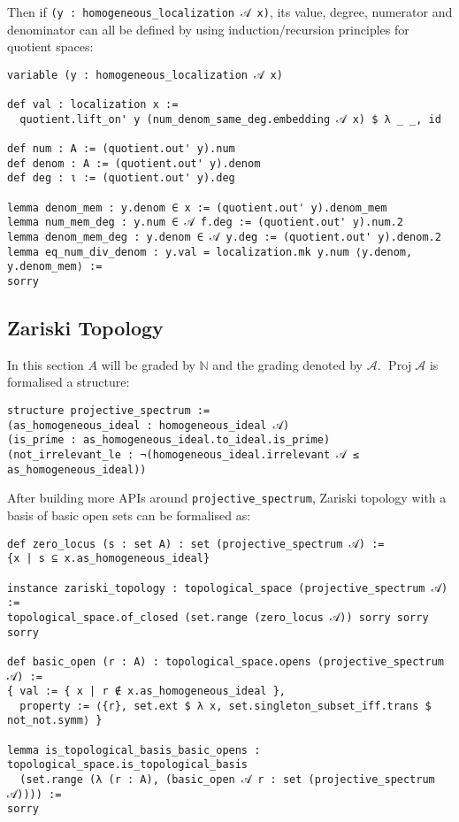 \documentclass[a4paper,UKenglish,cleveref, autoref, thm-restate]{lipics-v2021}
\begin{document}
Then if \lstinline{(y : homogeneous_localization 𝒜 x)}, its value, degree, numerator and denominator can all be defined by using induction/recursion principles for quotient spaces:
\begin{lstlisting}
variable (y : homogeneous_localization 𝒜 x)
 
def val : localization x :=
  quotient.lift_on' y (num_denom_same_deg.embedding 𝒜 x) $ λ _ _, id

def num : A := (quotient.out' y).num
def denom : A := (quotient.out' y).denom
def deg : ι := (quotient.out' y).deg

lemma denom_mem : y.denom ∈ x := (quotient.out' y).denom_mem
lemma num_mem_deg : y.num ∈ 𝒜 f.deg := (quotient.out' y).num.2
lemma denom_mem_deg : y.denom ∈ 𝒜 y.deg := (quotient.out' y).denom.2
lemma eq_num_div_denom : y.val = localization.mk y.num ⟨y.denom, y.denom_mem⟩ := 
sorry
\end{lstlisting}

\subsection{Zariski Topology}
In this section $A$ will be graded by $\mathbb{N}$ and the grading denoted by $\mathcal{A}$. $\operatorname{Proj}\mathcal{A}$ is formalised a structure:

\begin{lstlisting}
structure projective_spectrum :=
(as_homogeneous_ideal : homogeneous_ideal 𝒜)
(is_prime : as_homogeneous_ideal.to_ideal.is_prime)
(not_irrelevant_le : ¬(homogeneous_ideal.irrelevant 𝒜 ≤ as_homogeneous_ideal))
\end{lstlisting}

After building more APIs around \lstinline{projective_spectrum}, Zariski topology with a basis of basic open sets can be formalised as:
\begin{lstlisting}
def zero_locus (s : set A) : set (projective_spectrum 𝒜) :=
{x | s ⊆ x.as_homogeneous_ideal}

instance zariski_topology : topological_space (projective_spectrum 𝒜) :=
topological_space.of_closed (set.range (zero_locus 𝒜)) sorry sorry sorry

def basic_open (r : A) : topological_space.opens (projective_spectrum 𝒜) :=
{ val := { x | r ∉ x.as_homogeneous_ideal }, 
  property := ⟨{r}, set.ext $ λ x, set.singleton_subset_iff.trans $ not_not.symm⟩ }

lemma is_topological_basis_basic_opens : topological_space.is_topological_basis
  (set.range (λ (r : A), (basic_open 𝒜 r : set (projective_spectrum 𝒜)))) := 
sorry
\end{lstlisting}
\end{document}
